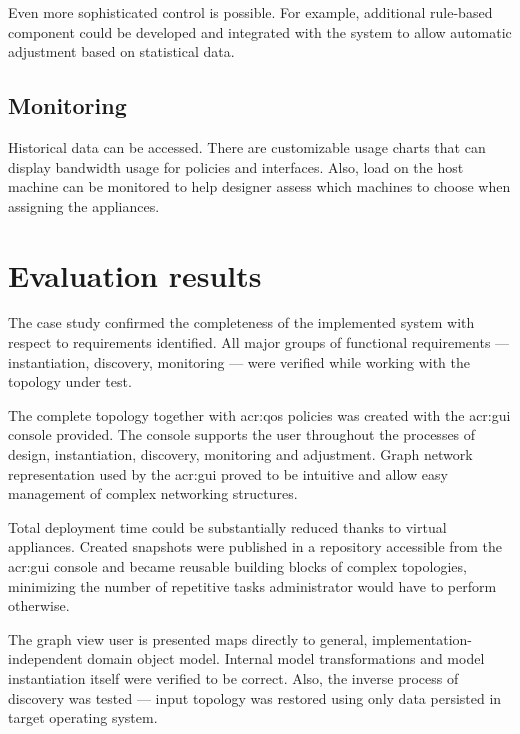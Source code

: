 \documentclass[11pt]{book}
\begin{document}
        Even more sophisticated control is possible. For example, additional rule-based component could be developed and
        integrated with the system to allow automatic adjustment based on statistical data.


      \subsection{Monitoring}
      \label{sub:uc:enhance:monitoring}

        Historical data can be accessed. There are customizable usage charts that can display bandwidth usage for
        policies and interfaces. Also, load on the host machine can be monitored to help designer assess which machines
        to choose when assigning the appliances.


    \section{Evaluation results}
    \label{sec:uc:eval}

      The case study confirmed the completeness of the implemented system with respect to requirements identified. All
      major groups of functional requirements --- instantiation, discovery, monitoring --- were verified while working
      with the topology under test.

      The complete topology together with \gls{acr:qos} policies was created with the \gls{acr:gui} console provided.
      The console supports the user throughout the processes of design, instantiation, discovery, monitoring and
      adjustment. Graph network representation used by the \gls{acr:gui} proved to be intuitive and allow easy
      management of complex networking structures.

      Total deployment time could be substantially reduced thanks to virtual appliances. Created snapshots were
      published in a repository accessible from the \gls{acr:gui} console and became reusable building blocks of complex
      topologies, minimizing the number of repetitive tasks administrator would have to perform otherwise.

      The graph view user is presented maps directly to general, implementation-independent domain object model.
      Internal model transformations and model instantiation itself were verified to be correct. Also, the inverse
      process of discovery was tested --- input topology was restored using only data persisted in target operating
      system.
\end{document}
